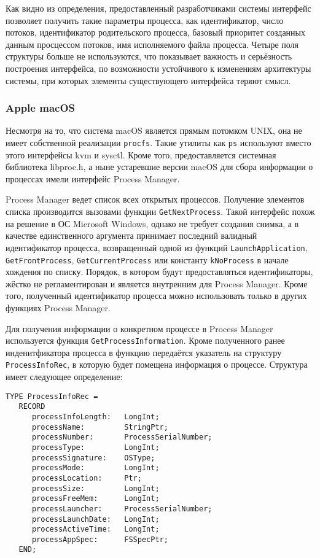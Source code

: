 Как видно из определения, предоставленный разработчиками системы интерфейс
позволяет получить такие параметры процесса, как идентификатор, число потоков,
идентификатор родительского процесса, базовый приоритет созданных данным
просцессом потоков, имя исполняемого файла процесса. Четыре поля структуры
больше не используются, что показывает важность и серьёзность построения
интерфейса, по возможности устойчивого к изменениям архитектуры системы, при
которых элементы существующего интерфейса теряют смысл.

\subsubsection{Apple macOS}
\label{sub:domain:analogs:macos}

Несмотря на то, что система macOS является прямым потомком UNIX, она не имеет
собственной реализации \texttt{procfs}. Такие утилиты как \texttt{ps} используют
вместо этого интерфейсы kvm и sysctl\cite{osxproc}. Кроме того, предоставляется
системная библиотека libproc.h, а ныне устаревшие версии macOS для сбора
информации о процессах имели интерфейс Process Manager.

Process Manager ведет список всех открытых процессов\cite{procmanag}. Получение
элементов списка производится вызовами функции \texttt{GetNextProcess}. Такой
интерфейс похож на решение в ОС Microsoft Windows, однако не требует создания
снимка, а в качестве единственного аргумента принимает последний валидный
идентификатор процесса, возвращенный одной из функций %
\texttt{LaunchApplication}, \texttt{GetFrontProcess}, \texttt{GetCurrentProcess}
или константу \texttt{kNoProcess} в начале хождения по списку. Порядок, в
котором будут предоставляться идентификаторы, жёстко не регламентирован и
является внутренним для Process Manager. Кроме того, полученный идентификатор
процесса можно использовать только в других функциях Process Manager.

Для получения информации о конкретном процессе в Process Manager используется
функция \texttt{GetProcessInformation}. Кроме полученного ранее инденитфикатора
процесса в функцию передаётся указатель на структуру \texttt{ProcessInfoRec}, в
которую будет помещена информация о процессе. Структура имеет следующее
определение:

\medskip
\begin{adjustwidth}{\fivecharsapprox}{}
\begin{lstlisting}[basicstyle=\fontencoding{T1}\small\ttfamily]
TYPE ProcessInfoRec =
   RECORD
      processInfoLength:   LongInt;
      processName:         StringPtr;
      processNumber:       ProcessSerialNumber;
      processType:         LongInt;
      processSignature:    OSType;
      processMode:         LongInt;
      processLocation:     Ptr;
      processSize:         LongInt;
      processFreeMem:      LongInt;
      processLauncher:     ProcessSerialNumber;
      processLaunchDate:   LongInt;
      processActiveTime:   LongInt;
      processAppSpec:      FSSpecPtr;
   END;
\end{lstlisting}
\end{adjustwidth}
\medskip

